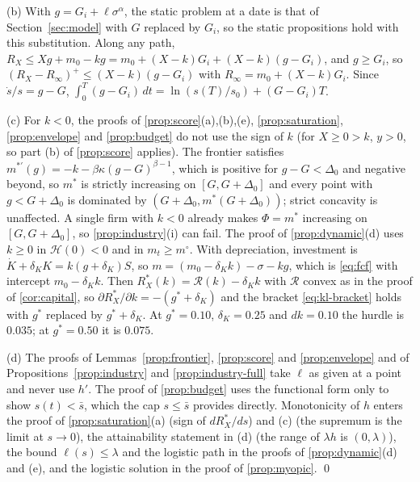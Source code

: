 (b) With $g=G_i+\ell\sigma^{\alpha}$, the static problem at a date is that of Section~\ref{sec:model} with $G$ replaced by $G_i$, so the static propositions hold with this substitution. Along any path, $R_X\le Xg+m_0-kg=m_0+(X-k)G_i+(X-k)(g-G_i)$, and $g\ge G_i$, so $(R_X-R_\infty)^+\le(X-k)(g-G_i)$ with $R_\infty=m_0+(X-k)G_i$. Since $\dot s/s=g-G$, $\int_0^T(g-G_i)\,dt=\ln(s(T)/s_0)+(G-G_i)T$.

(c) For $k<0$, the proofs of \autoref{prop:score}(a),(b),(e), \autoref{prop:saturation}, \autoref{prop:envelope} and \autoref{prop:budget} do not use the sign of $k$ (for $X\ge 0>k$, $y>0$, so part (b) of \autoref{prop:score} applies). The frontier satisfies $m^{*\prime}(g)=-k-\beta\kappa(g-G)^{\beta-1}$, which is positive for $g-G<\Delta_0$ and negative beyond, so $m^*$ is strictly increasing on $[G,G+\Delta_0]$ and every point with $g<G+\Delta_0$ is dominated by $(G+\Delta_0,m^*(G+\Delta_0))$; strict concavity is unaffected. A single firm with $k<0$ already makes $\Phi=m^*$ increasing on $[G,G+\Delta_0]$, so \autoref{prop:industry}(i) can fail. The proof of \autoref{prop:dynamic}(d) uses $k\ge 0$ in $\mathcal H(0)<0$ and in $m_t\ge m^\circ$. With depreciation, investment is $\dot K+\delta_KK=k(g+\delta_K)S$, so $m=(m_0-\delta_Kk)-\sigma-kg$, which is \eqref{eq:fcf} with intercept $m_0-\delta_Kk$. Then $R_X^*(k)=\mathcal R(k)-\delta_Kk$ with $\mathcal R$ convex as in the proof of \autoref{cor:capital}, so $\partial R_X^*/\partial k=-(g^*+\delta_K)$ and the bracket \eqref{eq:kl-bracket} holds with $g^*$ replaced by $g^*+\delta_K$. At $g^*=0.10$, $\delta_K=0.25$ and $dk=0.10$ the hurdle is $0.035$; at $g^*=0.50$ it is $0.075$.

(d) The proofs of Lemmas~\ref{prop:frontier}, \ref{prop:score} and \ref{prop:envelope} and of Propositions~\ref{prop:industry} and \ref{prop:industry-full} take $\ell$ as given at a point and never use $h'$. The proof of \autoref{prop:budget} uses the functional form only to show $s(t)<\bar s$, which the cap $s\le\bar s$ provides directly. Monotonicity of $h$ enters the proof of \autoref{prop:saturation}(a) (sign of $dR_X^*/ds$) and (c) (the supremum is the limit at $s\to 0$), the attainability statement in (d) (the range of $\lambda h$ is $(0,\lambda)$), the bound $\ell(s)\le\lambda$ and the logistic path in the proofs of \autoref{prop:dynamic}(d) and (e), and the logistic solution in the proof of \autoref{prop:myopic}. \qed
